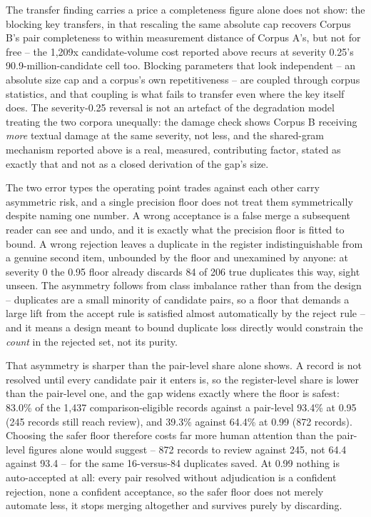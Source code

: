 \documentclass[conference]{IEEEtran}
\begin{document}
The transfer finding carries a price a completeness figure alone does
not show: the blocking key transfers, in that rescaling the same
absolute cap recovers Corpus B's pair completeness to within
measurement distance of Corpus A's, but not for free -- the 1,209x
candidate-volume cost reported above recurs at severity 0.25's
90.9-million-candidate cell too. Blocking parameters that look
independent -- an absolute size cap and a corpus's own repetitiveness
-- are coupled through corpus statistics, and that coupling is what
fails to transfer even where the key itself does. The severity-0.25
reversal is not an artefact of the degradation model treating the two
corpora unequally: the damage check shows Corpus B receiving
\emph{more} textual damage at the same severity, not less, and the
shared-gram mechanism reported above is a real, measured, contributing
factor, stated as exactly that and not as a closed derivation of the
gap's size.

The two error types the operating point trades against each other carry
asymmetric risk, and a single precision floor does not treat them
symmetrically despite naming one number. A wrong acceptance is a false
merge a subsequent reader can see and undo, and it is exactly what the
precision floor is fitted to bound. A wrong rejection leaves a duplicate
in the register indistinguishable from a genuine second item, unbounded
by the floor and unexamined by anyone: at severity 0 the 0.95 floor
already discards 84 of 206 true duplicates this way, sight unseen. The
asymmetry follows from class imbalance rather than from the design --
duplicates are a small minority of candidate pairs, so a floor that
demands a large lift from the accept rule is satisfied almost
automatically by the reject rule -- and it means a design meant to
bound duplicate loss directly would constrain the \emph{count} in the
rejected set, not its purity.

That asymmetry is sharper than the pair-level share alone shows. A
record is not resolved until every candidate pair it enters is, so the
register-level share is lower than the pair-level one, and the gap
widens exactly where the floor is safest: 83.0\% of the 1,437
comparison-eligible records against a pair-level 93.4\% at 0.95 (245
records still reach review), and 39.3\% against 64.4\% at 0.99 (872
records). Choosing the safer floor therefore costs far more human
attention than the pair-level figures alone would suggest -- 872
records to review against 245, not 64.4 against 93.4 -- for the same
16-versus-84 duplicates saved. At 0.99 nothing is auto-accepted at
all: every pair resolved without adjudication is a confident
rejection, none a confident acceptance, so the safer floor does not
merely automate less, it stops merging altogether and survives purely
by discarding.
\end{document}
